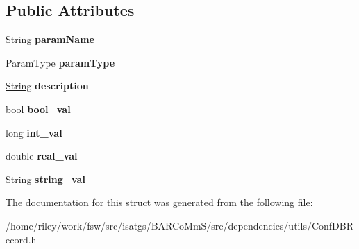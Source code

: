 \subsection*{Public Attributes}
\begin{DoxyCompactItemize}
\item 
\hyperlink{classisat__utils_1_1_string}{String} {\bfseries param\+Name}\hypertarget{structisat__utils_1_1_conf_d_b_record_a19383f4d9b04be00699573f37c377505}{}\label{structisat__utils_1_1_conf_d_b_record_a19383f4d9b04be00699573f37c377505}

\item 
Param\+Type {\bfseries param\+Type}\hypertarget{structisat__utils_1_1_conf_d_b_record_a8138b4ffdc45dece7d2640ed374c4fba}{}\label{structisat__utils_1_1_conf_d_b_record_a8138b4ffdc45dece7d2640ed374c4fba}

\item 
\hyperlink{classisat__utils_1_1_string}{String} {\bfseries description}\hypertarget{structisat__utils_1_1_conf_d_b_record_a2f2df7db2ce9408ea73e375c836f62e9}{}\label{structisat__utils_1_1_conf_d_b_record_a2f2df7db2ce9408ea73e375c836f62e9}

\item 
bool {\bfseries bool\+\_\+val}\hypertarget{structisat__utils_1_1_conf_d_b_record_a92408dad16fe9080359011e650768487}{}\label{structisat__utils_1_1_conf_d_b_record_a92408dad16fe9080359011e650768487}

\item 
long {\bfseries int\+\_\+val}\hypertarget{structisat__utils_1_1_conf_d_b_record_aeebd7aa509842f3ea933fd4ad145b2e8}{}\label{structisat__utils_1_1_conf_d_b_record_aeebd7aa509842f3ea933fd4ad145b2e8}

\item 
double {\bfseries real\+\_\+val}\hypertarget{structisat__utils_1_1_conf_d_b_record_a7dc605f5e51e57d918f9af5a43e76215}{}\label{structisat__utils_1_1_conf_d_b_record_a7dc605f5e51e57d918f9af5a43e76215}

\item 
\hyperlink{classisat__utils_1_1_string}{String} {\bfseries string\+\_\+val}\hypertarget{structisat__utils_1_1_conf_d_b_record_a74a7659f3f81e8ef6f8a4f0166679e59}{}\label{structisat__utils_1_1_conf_d_b_record_a74a7659f3f81e8ef6f8a4f0166679e59}

\end{DoxyCompactItemize}


The documentation for this struct was generated from the following file\+:\begin{DoxyCompactItemize}
\item 
/home/riley/work/fsw/src/isatgs/\+B\+A\+R\+Co\+Mm\+S/src/dependencies/utils/Conf\+D\+B\+Record.\+h\end{DoxyCompactItemize}
